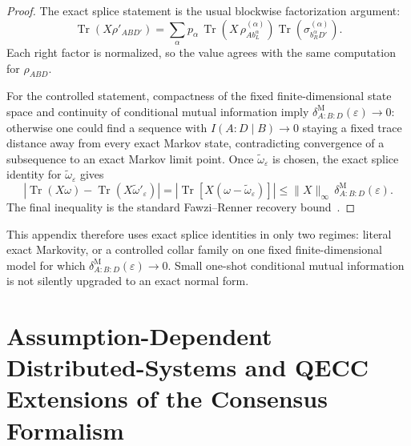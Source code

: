 \documentclass[11pt]{article}
\theoremstyle{remark}
\theoremstyle{plain}
\begin{document}
\begin{proof}
The exact splice statement is the usual blockwise factorization argument:
\[
\operatorname{Tr}(X\rho'_{AB D'})
=
\sum_\alpha
p_\alpha\,
\operatorname{Tr}\!\left(
X\, \rho^{(\alpha)}_{A b_L^\alpha}
\right)
\operatorname{Tr}\!\left(\sigma_{b_R^\alpha D'}^{(\alpha)}\right).
\]
Each right factor is normalized, so the value agrees with the same computation for \(\rho_{ABD}\).

For the controlled statement, compactness of the fixed finite-dimensional state space and continuity of conditional mutual information imply \(\delta^{\mathrm M}_{A:B:D}(\varepsilon)\to0\): otherwise one could find a sequence with \(I(A:D\mid B)\to0\) staying a fixed trace distance away from every exact Markov state, contradicting convergence of a subsequence to an exact Markov limit point. Once \(\widetilde\omega_\varepsilon\) is chosen, the exact splice identity for \(\widetilde\omega_\varepsilon\) gives
\[
\left|
\operatorname{Tr}(X\omega)-\operatorname{Tr}(X\widetilde\omega'_\varepsilon)
\right|
=
\left|
\operatorname{Tr}\!\left[X(\omega-\widetilde\omega_\varepsilon)\right]
\right|
\le
\|X\|_\infty\,
\delta^{\mathrm M}_{A:B:D}(\varepsilon).
\]
The final inequality is the standard Fawzi--Renner recovery bound~\cite{fawziRenner15}.
\end{proof}

This appendix therefore uses exact splice identities in only two regimes: literal exact Markovity, or a controlled collar family on one fixed finite-dimensional model for which \(\delta^{\mathrm M}_{A:B:D}(\varepsilon)\to0\). Small one-shot conditional mutual information is not silently upgraded to an exact normal form.



\section{Assumption-Dependent Distributed-Systems and QECC Extensions of the Consensus Formalism}\label{app:bft-qecc}

\end{document}
